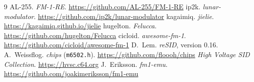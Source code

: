 \documentclass[10pt,a4paper]{article}
\newcommand{\code}[1]{\texttt{#1}}
\begin{document}
\begin{thebibliography}{9}\small
{} AL-255. \emph{FM-1-RE}. \url{https://github.com/AL-255/FM-1-RE}
 ip2k. \emph{lunar-modulator}. \url{https://github.com/ip2k/lunar-modulator}
 kagaimiq. \emph{jielie}. \url{https://kagaimiq.github.io/jielie}
 hugelton. \emph{Felucca}. \url{https://github.com/hugelton/Felucca}
 cicloid. \emph{awesome-fm-1}. \url{https://github.com/cicloid/awesome-fm-1}
 D.~Lem. \emph{reSID}, version 0.16.
 A.~Weissflog. \emph{chips} (\code{m6502.h}). \url{https://github.com/floooh/chips}
 \emph{High Voltage SID Collection}. \url{https://hvsc.c64.org}
 J.~Eriksson. \emph{fm1-emu}. \url{https://github.com/joakimeriksson/fm1-emu}
\end{thebibliography}
\end{document}
